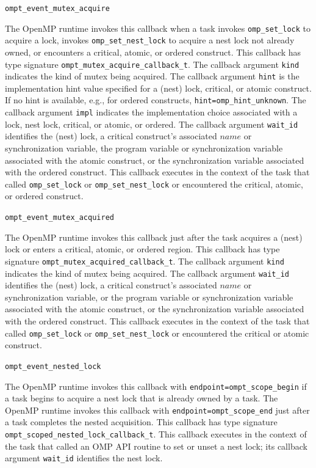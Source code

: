 \documentclass{article}
\newcommand{\descheader}[1]{{\needspace{3\baselineskip}\vspace{1em}\noindent \fbox{#1}}}
\begin{document}
\descheader{Lock, Nest Lock, Critical Section, Atomic, and Ordered}

\begin{description}

\item \verb|ompt_event_mutex_acquire| 

\sloppy
   The OpenMP runtime invokes this callback when a task invokes
    \verb|omp_set_lock| to acquire a lock, invokes \verb|omp_set_nest_lock| to acquire a nest lock not already owned,
   or encounters a critical, atomic, or ordered construct. 
   This callback has type signature \verb|ompt_mutex_acquire_callback_t|. 
    The callback argument \verb|kind| indicates the kind of mutex being acquired.
    The callback argument \verb|hint| is the implementation hint value specified for a (nest) lock, critical, or atomic construct.
    If no hint is available, e.g., for ordered constructs, \verb|hint=omp_hint_unknown|.
   The callback argument \verb|impl| indicates the implementation choice associated with a lock, nest lock, critical, or atomic, or ordered.
   The callback argument \verb|wait_id| identifies the (nest) lock, a critical construct's associated $name$ or synchronization variable, the program variable or synchronization variable associated with the atomic construct, or the synchronization variable associated with the ordered construct.
   This callback executes in the context of the task that called \verb|omp_set_lock| or \verb|omp_set_nest_lock| or encountered the
   critical, atomic, or ordered construct.

\item \verb|ompt_event_mutex_acquired| 

   The OpenMP runtime invokes this callback just after the task acquires a (nest) lock or enters a critical, atomic, or ordered region.
   This callback has type signature \verb|ompt_mutex_acquired_callback_t|. 
   The callback argument \verb|kind| indicates the kind of mutex being acquired.
   The callback argument \verb|wait_id| identifies the (nest) lock, a critical construct's associated $name$ or synchronization variable, or the program variable or synchronization variable associated with the atomic construct, or the synchronization variable associated with the ordered construct.
   This callback executes in the context of the task that called \verb|omp_set_lock| or \verb|omp_set_nest_lock| or encountered the
   critical or atomic construct.

\item \verb|ompt_event_nested_lock|

\sloppy
   The OpenMP runtime invokes this callback with \verb|endpoint=|\verb|ompt_scope_begin| if a task begins to acquire a nest lock that is already owned by a task.
   The OpenMP runtime invokes this callback with \verb|endpoint=|\verb|ompt_scope_end|  just after a task completes the nested acquisition.
   This callback  has type signature \verb|ompt_scoped_nested_lock_callback_t|. 
   This callback executes in the context of the task that called an OMP API routine to set or unset a nest lock; its
   callback argument \verb|wait_id| identifies the nest lock.

\end{description}
\end{document}
